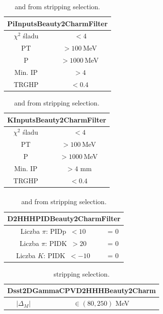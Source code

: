 \vspace{1ex}
\begin{table}[h!]
\centering
\begin{tabular}{|c|c|} \hline
\multicolumn{2}{|c|}{\bf{PiInputsBeauty2CharmFilter}}\\ \hline
$\chi^2$ śladu & $\ < 4$ \\ \hline
PT & $ > 100\ $MeV \\ \hline
P & $ > 1000 \ $MeV \\ \hline
Min. IP & $ > 4$ \\ \hline
TRGHP & $ < 0.4$ \\ \hline
\end{tabular}
\begin{tabular}{|c|c|} \hline
\multicolumn{2}{|c|}{\bf{KInputsBeauty2CharmFilter}}\\ \hline
$\chi^2$ śladu & $\ < 4$ \\ \hline
PT & $ > 100\ $MeV \\ \hline
P & $ > 1000 \ $MeV \\ \hline
Min. IP & $ > 4$ mm \\ \hline
TRGHP & $ < 0.4$ \\ \hline
\end{tabular}
\paragraph{}
\begin{tabular}{|c|c|} \hline
\multicolumn{2}{|c|}{\bf{D2HHHPIDBeauty2CharmFilter}}\\ \hline
Liczba $\pi$: PIDp $\ < 10$ & = 0 \\ \hline
Liczba $\pi$: PIDK $\ > 20$ & = 0 \\ \hline
Liczba $K$: PIDK $\ < -10$ & = 0 \\ \hline
\end{tabular}
\caption{\pion and \kaon from \Ds stripping selection.}
\label{tab:stripp_6}
\end{table}


\vspace{1ex}
\begin{table}[h!]
\centering
\begin{tabular}{|c|c|} \hline
\multicolumn{2}{|c|}{\bf{Dsst2DGammaCPVD2HHHBeauty2Charm}}\\ \hline
$|\Delta_M|$ & $\in (80,250)$ MeV \\ \hline
\end{tabular}
\caption{\Dss stripping selection.}
\label{tab:stripp_7}
\end{table}

